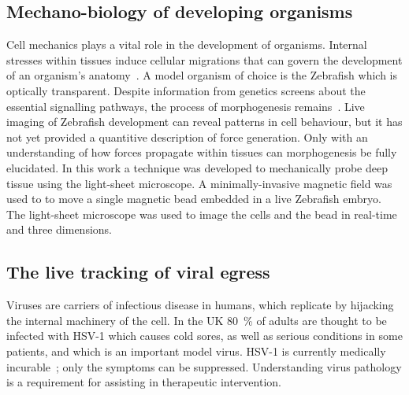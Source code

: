 \subsection{Mechano-biology of developing organisms}

Cell mechanics plays a vital role in the development of organisms.
Internal stresses within tissues induce cellular migrations that can govern the development of an organism's anatomy~\cite{gilbertDevelopmentalBiology2000}.
A model organism of choice is the Zebrafish which is optically transparent.
Despite information from genetics screens about the essential signalling pathways, the process of morphogenesis remains~\cite{mammotoMechanicalControlTissue2010,mammotoMechanobiologyDevelopmentalControl2013}.
Live imaging of Zebrafish development can reveal patterns in cell behaviour, but it has not yet provided a quantitive description of force generation.
Only with an understanding of how forces propagate within tissues can morphogenesis be fully elucidated.
%
In this work a technique was developed to mechanically probe deep tissue using the light-sheet microscope.
A minimally-invasive magnetic field was used to to move a single magnetic bead embedded in a live Zebrafish embryo.
The light-sheet microscope was used to image the cells and the bead in real-time and three dimensions.

\subsection{The live tracking of viral egress}

Viruses are carriers of infectious disease in humans, which replicate by hijacking the internal %
machinery of the cell.
In the UK \SI{80}{\percent} of adults are thought to be infected with \gls{HSV}-1 which causes cold sores, as well as serious conditions in some patients, and which is an important model virus.
\gls{HSV}-1 is currently medically incurable~\cite{_herpes_????}; only the symptoms can be suppressed.
Understanding virus pathology is a requirement for assisting in therapeutic intervention.

